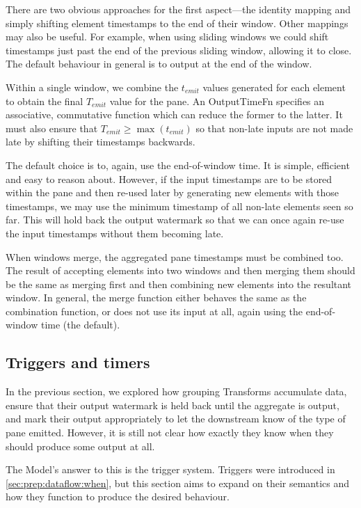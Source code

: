 There are two obvious approaches for the first aspect---the identity mapping and simply shifting element timestamps to the end of their window.
Other mappings may also be useful.
For example, when using sliding windows we could shift timestamps just past the end of the previous sliding window, allowing it to close.
The default behaviour in general is to output at the end of the window.

Within a single window, we combine the $t_{\mathit{emit}}$ values generated for each element to obtain the final $T_{\mathit{emit}}$ value for the pane.
An OutputTimeFn specifies an associative, commutative function which can reduce the former to the latter.
It must also ensure that $T_{\mathit{emit}} \geq \max(t_{\mathit{emit}})$ so that non-late inputs are not made late by shifting their timestamps backwards.

The default choice is to, again, use the end-of-window time.
It is simple, efficient and easy to reason about.
However, if the input timestamps are to be stored within the pane and then re-used later by generating new elements with those timestamps, we may use the minimum timestamp of all non-late elements seen so far.
This will hold back the output watermark so that we can once again re-use the input timestamps without them becoming late.

When windows merge, the aggregated pane timestamps must be combined too.
The result of accepting elements into two windows and then merging them should be the same as merging first and then combining new elements into the resultant window.
In general, the merge function either behaves the same as the combination function, or does not use its input at all, again using the end-of-window time (the default).

\subsection{Triggers and timers}\label{sec:impl:dataflow:triggers-timers}

In the previous section, we explored how grouping Transforms accumulate data, ensure that their output watermark is held back until the aggregate is output, and mark their output appropriately to let the downstream know of the type of pane emitted.
However, it is still not clear how exactly they know when they should produce some output at all.

The Model's answer to this is the trigger system.
Triggers were introduced in \cref{sec:prep:dataflow:when}, but this section aims to expand on their semantics and how they function to produce the desired behaviour.

